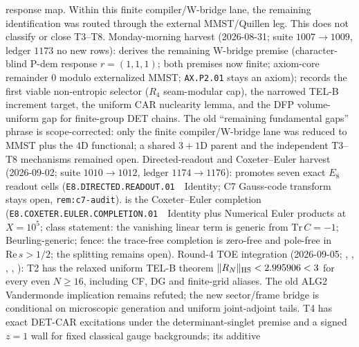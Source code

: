 \documentclass[11pt,a4paper]{article}
\begin{document}
response map.  Within this finite compiler/W-bridge lane, the remaining identification
was routed through the external MMST/Quillen leg.  This does not classify or close T3--T8.
Monday-morning harvest (2026-08-31; suite $1007\to1009$, ledger $1173$ no new rows):
derives the remaining W-bridge premise (character-blind P-dem response $r=(1,1,1)$;
both premises now finite; axiom-core remainder $0$ modulo externalized MMST;
\texttt{AX.P2.01} stays an axiom);
records the first viable non-entropic selector ($R_4$ seam-modular cap), the narrowed
TEL-B increment target, the uniform CAR nuclearity lemma, and the DFP volume-uniform gap
for finite-group DET chains.  The old ``remaining fundamental gaps'' phrase is
scope-corrected: only the finite compiler/W-bridge lane was reduced to MMST plus the
$4$D functional; a shared $3{+}1$D parent and the independent T3--T8 mechanisms remained open.
Directed-readout and Coxeter--Euler harvest (2026-09-02; suite $1010\to1012$, ledger $1174\to1176$):
promotes seven exact $E_8$ readout cells (\texttt{E8.DIRECTED.READOUT.01}~\mE\ Identity;
C7 Gauss-code transform stays open, \texttt{rem:c7-audit}).
is the Coxeter--Euler completion (\texttt{E8.COXETER.EULER.COMPLETION.01}~\mE\ Identity plus Numerical Euler products at $X=10^5$;
class statement: the vanishing linear term is generic from $\mathrm{Tr}\,C=-1$; Beurling-generic;
fence: the trace-free completion is zero-free and pole-free in $\mathrm{Re}\,s>1/2$; the splitting remains open).
Round-4 TOE integration (2026-09-05;
,
,
,
,
):
T2 has the relaxed uniform TEL-B theorem $\|R_N\|_{\rm HS}<2.995906<3$
for every even $N\ge16$, including CF, DG and finite-grid aliases. The old
ALG2 Vandermonde implication remains refuted; the new sector/frame bridge
is conditional on microscopic generation and uniform joint-adjoint tails.
T4 has exact DET-CAR excitations under the determinant-singlet premise and
a signed $z=1$ wall for fixed classical gauge backgrounds; its additive
\end{document}
